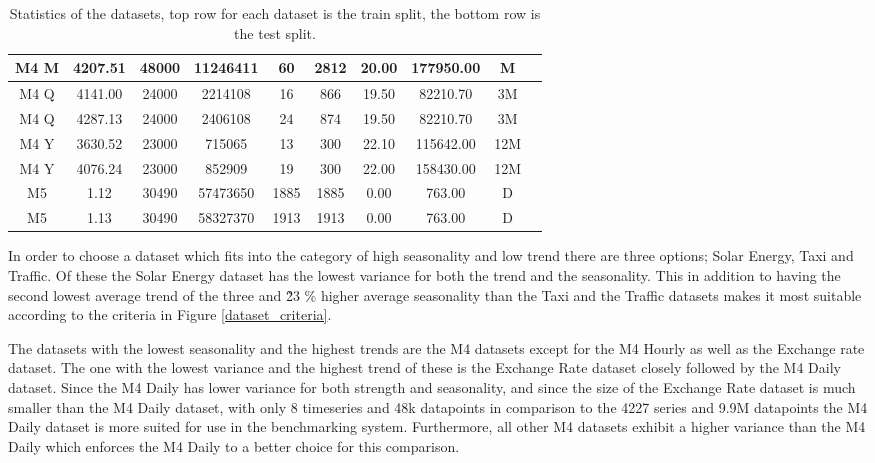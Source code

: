 \begin{table}[htb]
\begin{tabular}{c | c c c c c c c c c}
    M4 M              & 4207.51        & 48000            & 11246411        & 60                 & 2812              & 20.00         & 177950.00     & M               \\
    \hline
    M4 Q              & 4141.00        & 24000            & 2214108         & 16                 & 866               & 19.50         & 82210.70      & 3M              \\
    M4 Q              & 4287.13        & 24000            & 2406108         & 24                 & 874               & 19.50         & 82210.70      & 3M              \\
    \hline
    M4 Y              & 3630.52        & 23000            & 715065          & 13                 & 300               & 22.10         & 115642.00     & 12M             \\
    M4 Y              & 4076.24        & 23000            & 852909          & 19                 & 300               & 22.00         & 158430.00     & 12M             \\
    \hline
    M5                & 1.12           & 30490            & 57473650        & 1885               & 1885              & 0.00          & 763.00        & D               \\
    M5                & 1.13           & 30490            & 58327370        & 1913               & 1913              & 0.00          & 763.00        & D               \\
    \hline
  \end{tabular}
  \caption{Statistics of the datasets, top row for each dataset is the train split, the bottom row is the test split.}
  \label{tab:dataset_statistics}
\end{table}
\clearpage


In order to choose a dataset which fits into the category of high seasonality and low trend there are three options; Solar Energy, Taxi and Traffic. Of these the Solar Energy dataset has the lowest variance for both the trend and the seasonality. This in addition to having the second lowest average trend of the three and \~23 \% higher average seasonality than the Taxi and the Traffic datasets makes it most suitable according to the criteria in Figure \ref{dataset_criteria}.

The datasets with the lowest seasonality and the highest trends are the M4 datasets except for the M4 Hourly as well as the Exchange rate dataset. The one with the lowest variance and the highest trend of these is the Exchange Rate dataset closely followed by the M4 Daily dataset. Since the M4 Daily has lower variance for both strength and seasonality, and since the size of the Exchange Rate dataset is much smaller than the M4 Daily dataset, with only 8 timeseries and 48k datapoints in comparison to the 4227 series and 9.9M datapoints the M4 Daily dataset is more suited for use in the benchmarking system. Furthermore, all other M4 datasets exhibit a higher variance than the M4 Daily which enforces the M4 Daily to a better choice for this comparison.

